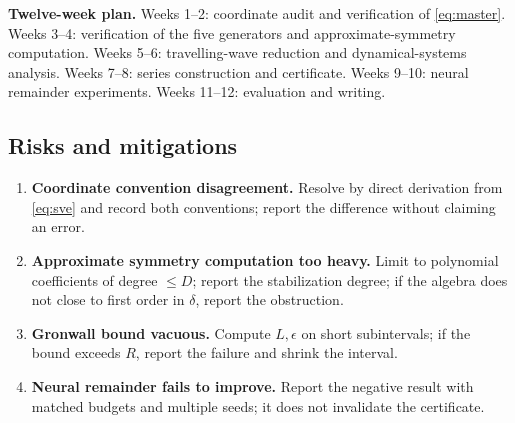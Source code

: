 \documentclass[12pt,a4paper]{article}
\begin{document}
\textbf{Twelve-week plan.} Weeks 1--2: coordinate audit and verification of \eqref{eq:master}. Weeks 3--4: verification of the five generators and approximate-symmetry computation. Weeks 5--6: travelling-wave reduction and dynamical-systems analysis. Weeks 7--8: series construction and certificate. Weeks 9--10: neural remainder experiments. Weeks 11--12: evaluation and writing.

\subsection*{Risks and mitigations}
\begin{enumerate}
\item \textbf{Coordinate convention disagreement.} Resolve by direct derivation from \eqref{eq:sve} and record both conventions; report the difference without claiming an error.
\item \textbf{Approximate symmetry computation too heavy.} Limit to polynomial coefficients of degree $\le D$; report the stabilization degree; if the algebra does not close to first order in $\delta$, report the obstruction.
\item \textbf{Gronwall bound vacuous.} Compute $L,\epsilon$ on short subintervals; if the bound exceeds $R$, report the failure and shrink the interval.
\item \textbf{Neural remainder fails to improve.} Report the negative result with matched budgets and multiple seeds; it does not invalidate the certificate.
\end{enumerate}
\end{document}
